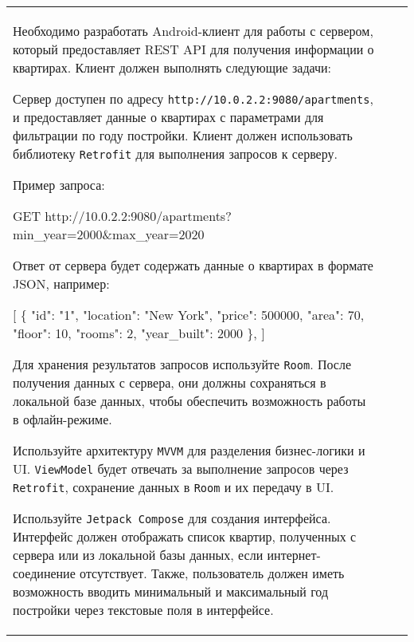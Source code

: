 \documentclass[a4paper]{article}
\begin{document}
\begin{tabular}{!{\vrule width 2pt}p{5cm}|p{6cm}|p{4cm}!{\vrule width 2pt}}
{\begin{minipage}{16cm}
\begin{enumerate}
Необходимо разработать Android-клиент для работы с сервером, который предоставляет REST API для получения информации о квартирах. Клиент должен выполнять следующие задачи:

Сервер доступен по адресу \texttt{http://10.0.2.2:9080/apartments}, и предоставляет данные о квартирах с параметрами для фильтрации по году постройки. Клиент должен использовать библиотеку \texttt{Retrofit} для выполнения запросов к серверу.

Пример запроса:

GET http://10.0.2.2:9080/apartments?min\_year=2000\&max\_year=2020


Ответ от сервера будет содержать данные о квартирах в формате JSON, например:


[
  \{
    "id": "1",
    "location": "New York",
    "price": 500000,
    "area": 70,
    "floor": 10,
    "rooms": 2,
    "year\_built": 2000
  \},
]


Для хранения результатов запросов используйте \texttt{Room}. 
После получения данных с сервера, они должны сохраняться в локальной базе данных, 
чтобы обеспечить возможность работы в офлайн-режиме. 

Используйте архитектуру \texttt{MVVM} для разделения бизнес-логики и UI. \texttt{ViewModel} будет отвечать за выполнение запросов через \texttt{Retrofit}, сохранение данных в \texttt{Room} и их передачу в UI.

Используйте \texttt{Jetpack Compose} для создания интерфейса. Интерфейс должен отображать список квартир, полученных с сервера или из локальной базы данных, если интернет-соединение отсутствует. Также, пользователь должен иметь возможность вводить минимальный и максимальный год постройки через текстовые поля в интерфейсе.


\end{enumerate}
\end{minipage}}
\end{tabular}
\end{document}
